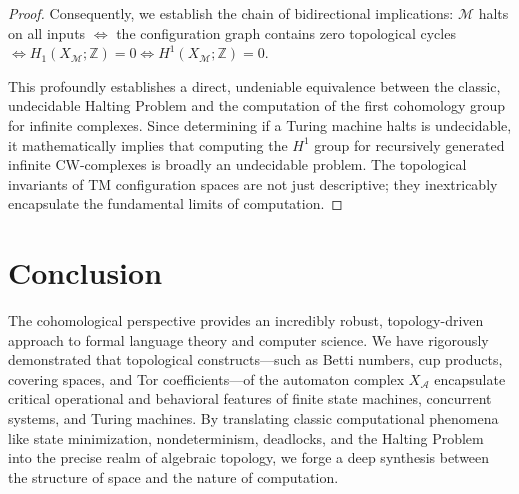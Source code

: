 \begin{proof}
Consequently, we establish the chain of bidirectional implications: $\mathcal{M}$ halts on all inputs $\iff$ the configuration graph contains zero topological cycles $\iff H_1(X_\mathcal{M}; \mathbb{Z}) = 0 \iff H^1(X_\mathcal{M}; \mathbb{Z}) = 0$.

This profoundly establishes a direct, undeniable equivalence between the classic, undecidable Halting Problem and the computation of the first cohomology group for infinite complexes. Since determining if a Turing machine halts is undecidable, it mathematically implies that computing the $H^1$ group for recursively generated infinite CW-complexes is broadly an undecidable problem. The topological invariants of TM configuration spaces are not just descriptive; they inextricably encapsulate the fundamental limits of computation.
\end{proof}

\section{Conclusion}

The cohomological perspective provides an incredibly robust, topology-driven approach to formal language theory and computer science. We have rigorously demonstrated that topological constructs—such as Betti numbers, cup products, covering spaces, and Tor coefficients—of the automaton complex $X_\mathcal{A}$ encapsulate critical operational and behavioral features of finite state machines, concurrent systems, and Turing machines. By translating classic computational phenomena like state minimization, nondeterminism, deadlocks, and the Halting Problem into the precise realm of algebraic topology, we forge a deep synthesis between the structure of space and the nature of computation.

